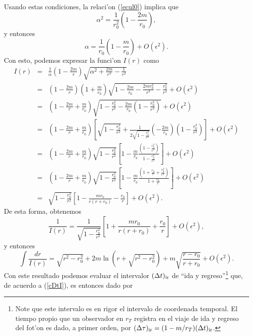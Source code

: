 Usando estas condiciones, la relaci'on (\ref{ecul0}) implica que
\begin{equation}
 \alpha^2=\frac{1}{r^2_0}\left(1-\frac{2m}{r_0}\right),
\end{equation}
y entonces
\begin{equation}
\alpha=\frac{1}{r_0}\left(1-\frac{m}{r_0}\right)+O(\epsilon^2).
\end{equation}
Con esto, podemos expresar la funci'on $I(r)$ como
\begin{eqnarray}
 I(r)&=&\frac{1}{\alpha}\left(1-\frac{2m}{r}\right)\sqrt{\alpha^2+\frac{2m}{r^3}-\frac{1}{r^2}} \\
&=&\left(1-\frac{2m}{r}\right)\left(1+\frac{m}{r_0}\right)\sqrt{1-\frac{2m}{r_0}-\frac{2mr_0^2}{r^3}-\frac{r_0^2}{r^2}} +O(\epsilon^2)\\
&=&\left(1-\frac{2m}{r}+\frac{m}{r_0}\right)\sqrt{1-\frac{r_0^2}{r^2}-\frac{2m}{r_0}\left(1-\frac{r_0^3}{r^3}\right)}+O(\epsilon^2) \\
&=&\left(1-\frac{2m}{r}+\frac{m}{r_0}\right)\left[\sqrt{1-\frac{r_0^2}{r^2}}+\frac{1}{2\sqrt{1-\frac{r_0^2}{r^2}}}\left(-\frac{2m}{r_0}\right)\left(1-\frac{r_0^3}{r^3}\right)\right] +O(\epsilon^2)\\
&=&\left(1-\frac{2m}{r}+\frac{m}{r_0}\right)\sqrt{1-\frac{r_0^2}{r^2}}\left[1-\frac{m}{r_0}\frac{\left(1-\frac{r_0^3}{r^3}\right)}{1-\frac{r_0^2}{r^2}}\right] +O(\epsilon^2)\\
&=&\left(1-\frac{2m}{r}+\frac{m}{r_0}\right)\sqrt{1-\frac{r_0^2}{r^2}}\left[1-\frac{m}{r_0}\frac{\left(1+\frac{r_0}{r}+\frac{r_0^2}{r^2}\right)}{1+\frac{r_0}{r}}\right]+O(\epsilon^2) \\
&=&\sqrt{1-\frac{r_0^2}{r^2}}\left[1-\frac{mr_0}{r(r+r_0)}-\frac{r_0}{r}\right]+O(\epsilon^2).
\end{eqnarray}
De esta forma, obtenemos
\begin{equation}
 \frac{1}{I(r)}=\frac{1}{\sqrt{1-\frac{r_0^2}{r^2}}}\left[1+\frac{mr_0}{r(r+r_0)}+\frac{r_0}{r}\right]+O(\epsilon^2),
\end{equation}
y entonces
\begin{equation}
 \int\frac{dr}{I(r)}=\sqrt{r^2-r_0^2}+2m\ln\left(r+\sqrt{r^2-r_0^2}\right)+m\sqrt{\frac{r-r_0}{r+r_0}}+O(\epsilon^2).
\end{equation}
Con este resultado podemos evaluar el intervalor $(\Delta t)_{\rm ir}$ de ``ida y regreso''\footnote{Note que este intervalo es en rigor el intervalo de coordenada temporal. El tiempo propio que un observador en $r_T$ registra en el viaje de ida y regreso del fot'on es dado, a primer orden, por $(\Delta\tau)_{\rm ir}=(1-m/r_T)(\Delta t)_{\rm ir}$.} que, de acuerdo a (\ref{cDtI}), es entonces dado por

